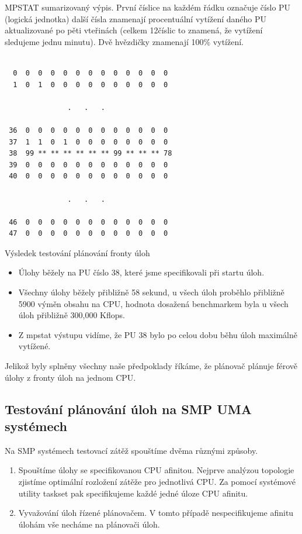\documentclass[a4paper,12pt]{article}
\begin{document}
MPSTAT sumarizovaný výpis. První číslice na každém řádku označuje číslo PU (logická jednotka) další čísla znamenají procentuální vytížení daného PU aktualizované po pěti vteřinách (celkem 12číslic to znamená, že vytížení sledujeme jednu minutu). Dvě hvězdičky znamenají 100\% vytížení. 

\begin{verbatim}

  0  0  0  0  0  0  0  0  0  0  0  0  0
  1  0  1  0  0  0  0  0  0  0  0  0  0
 
               .   .   .

 36  0  0  0  0  0  0  0  0  0  0  0  0
 37  1  1  0  1  0  0  0  0  0  0  0  0
 38  99 ** ** ** ** ** ** 99 ** ** ** 78
 39  0  0  0  0  0  0  0  0  0  0  0  0
 40  0  0  0  0  0  0  0  0  0  0  0  0

               .   .   .

 46  0  0  0  0  0  0  0  0  0  0  0  0
 47  0  0  0  0  0  0  0  0  0  0  0  0

\end{verbatim}

Výsledek testování plánování fronty úloh
\begin{itemize}
\item Úlohy běžely na PU číslo 38, které jsme specifikovali při startu úloh.
\item Všechny úlohy běžely přibližně 58 sekund, u všech úloh proběhlo přibližně 5900 výměn obsahu na CPU, hodnota dosažená benchmarkem byla u všech úloh přibližně 300,000 Kflops.
\item Z mpstat výstupu vidíme, že PU 38 bylo po celou dobu běhu úloh maximálně vytížené.
\end{itemize}

Jelikož byly splněny všechny naše předpoklady říkáme, že plánovač plánuje férově úlohy z fronty úloh na jednom CPU.

\subsection{Testování plánování úloh na SMP UMA systémech}

Na SMP systémech testovací zátěž spouštíme dvěma různými způsoby.
\begin{enumerate}
\item Spouštíme úlohy se specifikovanou CPU afinitou. Nejprve analýzou topologie zjistíme optimální rozložení zátěže pro jednotlivá CPU. Za pomocí systémové utility taskset pak specifikujeme každé jedné úloze CPU afinitu.  
\item Vyvažování úloh řízené plánovačem. V tomto případě nespecifikujeme afinitu úlohám vše necháme na plánovači úloh.
\end{enumerate}
\end{document}
